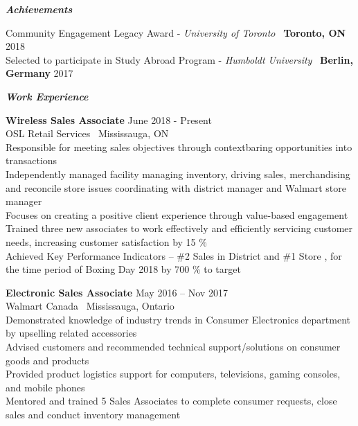 \documentclass{article}
\begin{document}
\bigskip

\begin{center}
    \large  \textcolor{ablue}{\textit{\textbf{Achievements}}}
   \end{center}
   
\indent Community Engagement Legacy Award - \textit{University of Toronto} \textbar  \ \textbf{Toronto, ON}
\hfill 2018
\\\indent Selected to participate in Study Abroad Program - \textit{Humboldt University} \textbar \  \textbf{Berlin, Germany}
\hfill 2017


\newpage

\begin{center}
  \large  \textcolor{ablue}{\textit{\textbf{Work Experience}}}
\end{center}


\noindent \textbf{Wireless Sales Associate}                                                          
\hfill June 2018 - Present 
\\ \noindent OSL Retail Services  \textbar \  Mississauga, ON                  
\\Responsible for meeting sales objectives through contextbaring opportunities into transactions
\\Independently managed facility managing inventory, driving sales, merchandising and reconcile store issues  coordinating with district manager and Walmart store manager 
\\Focuses on creating a positive client experience through value-based engagement
\\Trained three new associates to work effectively and efficiently servicing customer needs, increasing customer satisfaction by 15 \%
\\Achieved Key Performance Indicators – \#2 Sales in District and  \#1 Store , for the time period of Boxing Day 2018 by 700 \% to target

\bigskip


\noindent \textbf{Electronic Sales Associate}                                                                
\hfill May 2016 – Nov 2017 
\\ \noindent Walmart Canada  \textbar \  Mississauga, Ontario                 
\\Demonstrated knowledge of industry trends in Consumer Electronics department by upselling  related accessories
\\Advised customers and recommended technical support/solutions on consumer goods and products
\\Provided product logistics support for computers, televisions, gaming consoles, and mobile phones 
\\Mentored and trained 5 Sales Associates to complete consumer requests, close sales and conduct inventory management 
\end{document}

